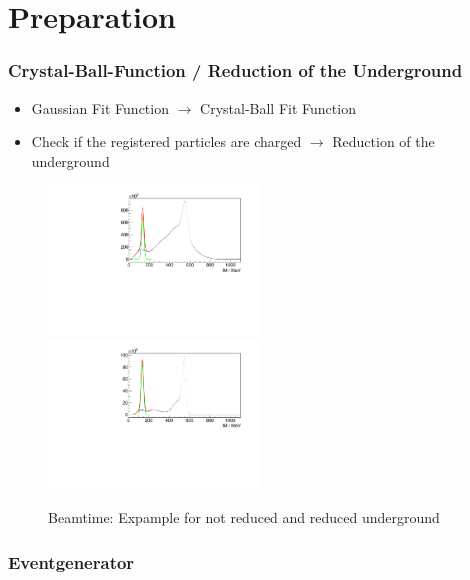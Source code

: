 \documentclass{beamer}
\begin{document}
\section{Preparation}
\begin{frame}
	\frametitle{Crystal-Ball-Function / Reduction of the Underground}
	\begin{itemize}
		\item Gaussian Fit Function $\rightarrow$ Crystal-Ball Fit Function
		\pause
		\item Check if the registered particles are charged $\rightarrow$ Reduction of the underground
	\end{itemize}

\pause
\begin{figure}
	
		\includegraphics[width=0.50\textwidth]{Pictures/20171904RealIntervalFitExample}
	\hfill
		\includegraphics[width=0.50\textwidth]{Pictures/20171904RealUnchargedFitExample}
		\caption{Beamtime: Expample for not reduced and reduced underground}
\end{figure}

\end{frame}
\begin{frame}
\frametitle{Eventgenerator}
\end{frame}
\end{document}
